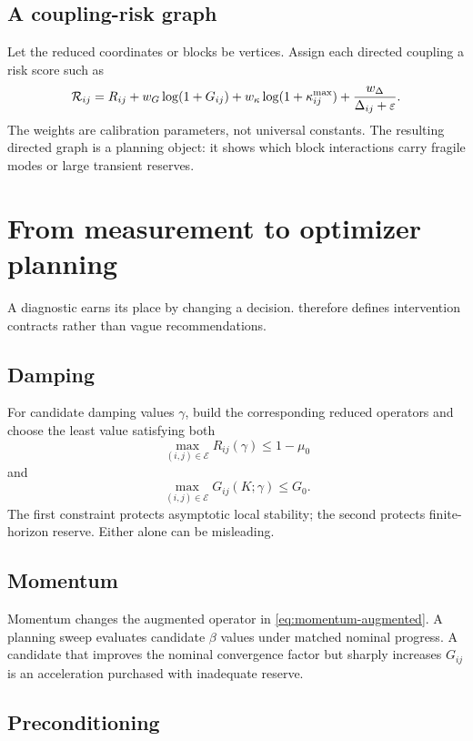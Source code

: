 \subsection{A coupling-risk graph}

Let the reduced coordinates or blocks be vertices.  Assign each directed coupling a risk score such as
\begin{equation}
\mathcal R_{ij}
=
R_{ij}
+w_G\log(1+G_{ij})
+w_\kappa\log(1+\kappa_{ij}^{\max})
+\frac{w_\Delta}{\Delta_{ij}+\varepsilon}.
\label{eq:risk-score}
\end{equation}
The weights are calibration parameters, not universal constants.  The resulting directed graph is a planning object: it shows which block interactions carry fragile modes or large transient reserves.

\section{From measurement to optimizer planning}

A diagnostic earns its place by changing a decision.  \cps{} therefore defines intervention contracts rather than vague recommendations.

\subsection{Damping}

For candidate damping values \(\gamma\), build the corresponding reduced operators and choose the least value satisfying both
\[
\max_{(i,j)\in\mathcal E}R_{ij}(\gamma)\leq1-\mu_0
\]
and
\[
\max_{(i,j)\in\mathcal E}G_{ij}(K;\gamma)\leq G_0.
\]
The first constraint protects asymptotic local stability; the second protects finite-horizon reserve.  Either alone can be misleading.

\subsection{Momentum}

Momentum changes the augmented operator in \cref{eq:momentum-augmented}.  A planning sweep evaluates candidate \(\beta\) values under matched nominal progress.  A candidate that improves the nominal convergence factor but sharply increases \(G_{ij}\) is an acceleration purchased with inadequate reserve.

\subsection{Preconditioning}

